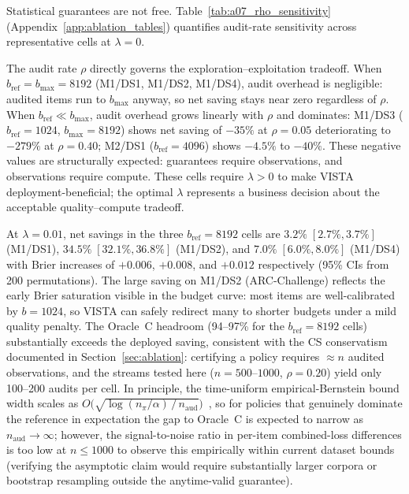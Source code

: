 \documentclass[a4paper,fleqn]{cas-sc}
\theoremstyle{plain}
\theoremstyle{definition}
\theoremstyle{remark}
\begin{document}
Statistical guarantees are not free.
Table~\ref{tab:a07_rho_sensitivity} (Appendix~\ref{app:ablation_tables}) quantifies
audit-rate sensitivity across representative cells at $\lambda{=}0$.

The audit rate $\rho$ directly governs the exploration--exploitation tradeoff.
When $b_{\mathrm{ref}}{=}b_{\max}{=}8192$ (M1/DS1, M1/DS2, M1/DS4), audit overhead
is negligible: audited items run to $b_{\max}$ anyway, so net saving stays near zero
regardless of $\rho$.
When $b_{\mathrm{ref}} \ll b_{\max}$, audit overhead grows linearly with $\rho$ and
dominates: M1/DS3 ($b_{\mathrm{ref}}{=}1024$, $b_{\max}{=}8192$) shows net saving
of $-35\%$ at $\rho{=}0.05$ deteriorating to $-279\%$ at $\rho{=}0.40$; M2/DS1
($b_{\mathrm{ref}}{=}4096$) shows $-4.5\%$ to $-40\%$.
These negative values are structurally expected: guarantees require observations, and
observations require compute.
These cells require $\lambda{>}0$ to make VISTA deployment-beneficial; the optimal
$\lambda$ represents a business decision about the acceptable quality--compute tradeoff.

At $\lambda{=}0.01$, net savings in the three $b_{\mathrm{ref}}{=}8192$ cells
are $3.2\%\;[2.7\%,3.7\%]$ (M1/DS1), $34.5\%\;[32.1\%,36.8\%]$ (M1/DS2), and
$7.0\%\;[6.0\%,8.0\%]$ (M1/DS4) with Brier increases of $+0.006$, $+0.008$, and
$+0.012$ respectively (95\% CIs from 200 permutations).
The large saving on M1/DS2 (ARC-Challenge) reflects the early Brier saturation
visible in the budget curve: most items are well-calibrated by $b{=}1024$,
so VISTA can safely redirect many to shorter budgets under a mild quality penalty.
The Oracle~C headroom (94--97\% for the $b_{\mathrm{ref}}{=}8192$ cells) substantially exceeds the
deployed saving, consistent with the CS conservatism documented in
Section~\ref{sec:ablation}: certifying a policy requires $\approx n$ audited
observations, and the streams tested here ($n{=}500$--$1000$, $\rho{=}0.20$)
yield only 100--200 audits per cell.
In principle, the time-uniform empirical-Bernstein bound width scales as
$O\!\bigl(\sqrt{\log(n_{\pi}/\alpha)\,/\,n_{\mathrm{aud}}}\bigr)$~\cite{howard2021confidence,waudbysmith2024betting,ramdas2023safe},
so for policies that genuinely dominate the reference in expectation the gap
to Oracle~C is expected to narrow as $n_{\mathrm{aud}}\!\to\!\infty$;
however, the signal-to-noise ratio in per-item combined-loss differences is
too low at $n{\leq}1000$ to observe this empirically within current
dataset bounds (verifying the asymptotic claim would require substantially
larger corpora or bootstrap resampling outside the anytime-valid guarantee).
\end{document}

